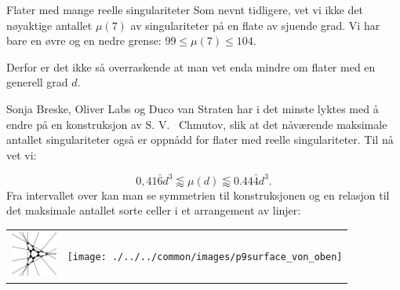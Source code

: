 \begin{surferPage}[216 singulariteter]{Flater med mange reelle singulariteter}
    Som nevnt tidligere, vet vi ikke det nøyaktige antallet 
    $\mu(7)$ av singulariteter på en flate av sjuende grad.
    Vi har bare en øvre og en nedre grense: $99\le \mu(7) \le 104$. 

	Derfor er det ikke så overraskende at man vet enda mindre om flater med en generell grad $d$.
	
	Sonja Breske, Oliver Labs og Duco van Straten har i det minste lyktes med å endre på en konstruksjon 
	av S. V. \ Chmutov, slik at det nåværende maksimale antallet
	singulariteter også er oppnådd for flater med reelle singulariteter. Til nå vet vi:
 
    \[0,41\bar{6}d^3 \lessapprox \mu(d) \lessapprox 0.44\bar{4} d^3.\]
Fra intervallet over kan man se symmetrien til konstruksjonen og en relasjon til det maksimale antallet sorte celler i et arrangement av linjer:
    \begin{center}
      \begin{tabular}{c@{\qquad}c}
        \includegraphics[height=1.5cm]{./../../common/images/vielesing.pdf}
        &
        \texttt{[image: ./../../common/images/p9surface\_von\_oben]}
      \end{tabular}
    \end{center}
\end{surferPage}

